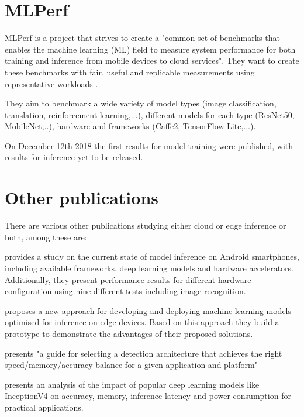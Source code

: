 \section{MLPerf}
MLPerf is a project that strives to create a "common set of benchmarks that enables the machine learning (ML) field to measure system performance for both training and inference from mobile devices to cloud services"\cite{mlperfWebsite}.
They want to create these benchmarks with fair, useful and replicable  measurements using representative workloads \cite{mlperf}. 

They aim to benchmark a wide variety of model types (image classification, translation, reinforcement learning,...), different models for each type (ResNet50, MobileNet,..), hardware and frameworks (Caffe2, TensorFlow Lite,...).

On December 12th 2018 the first results for model training were published, with results for inference yet to be released.


\section{Other publications}
There are various other publications studying either cloud or edge inference or both, among these are:



\cite{DBLP:journals/corr/abs-1810-01109} provides a study on the current state of model inference on Android smartphones, including available frameworks, deep learning models and hardware accelerators. Additionally, they present performance results for different hardware configuration using nine different tests including image recognition.

\cite{rethinkingDeployment} proposes a new approach for developing and deploying machine learning models optimised for inference on edge devices. Based on this approach they build a prototype to demonstrate the advantages of their proposed solutions.


\cite{DBLP:journals/corr/HuangRSZKFFWSG016} presents "a guide for selecting a detection architecture that achieves the right
speed/memory/accuracy balance for a given application and platform"



\cite{DBLP:journals/corr/CanzianiPC16} presents an analysis of the impact of popular deep learning models like InceptionV4 on accuracy, memory, inference latency and power consumption for practical applications.


